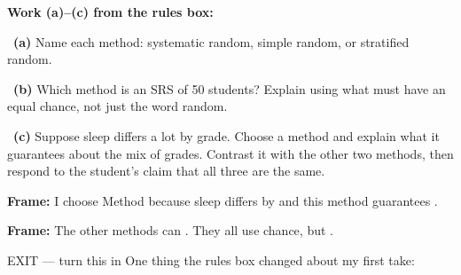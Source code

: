 \documentclass[11pt]{article}
\begin{document}
\newpage
\textbf{Work (a)--(c) from the rules box:}\par\smallskip

~\textbf{(a)} Name each method: systematic random, simple random, or stratified random.\par
\workspace{0.7in}

~\textbf{(b)} Which method is an SRS of 50 students? Explain using what must have an equal chance, not just the word random.\par
\workspace{1.4in}

~\textbf{(c)} Suppose sleep differs a lot by grade. Choose a method and explain what it guarantees about the mix of grades. Contrast it with the other two methods, then respond to the student's claim that all three are the same.\par
\workspace{2.0in}

\begin{sentenceframebox}\raggedright\textbf{Frame:} I choose Method \blank[0.4in] because sleep differs by \blank[0.8in] and this method guarantees \blank[1.7in].\end{sentenceframebox}

\begin{sentenceframebox}\raggedright\textbf{Frame:} The other methods can \blank[1.8in]. They all use chance, but \blank[2in].\end{sentenceframebox}

\begin{summaryexitbox}{EXIT --- turn this in}
One thing the rules box changed about my first take: \hrulefill\par
\workspace{0.4in}
\end{summaryexitbox}
\end{document}
